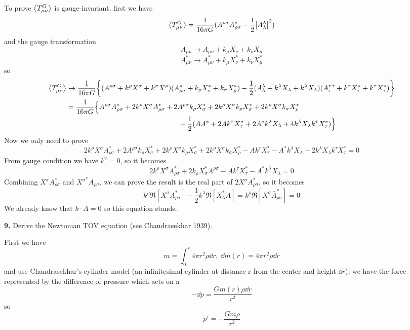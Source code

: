 \documentclass{article}
\newcommand{\la}{\lambda}
\newcommand{\s}{\sigma}
\begin{document}
To prove $\expval{T^G_{\mu\nu}}$ is gauge-invariant, first we have
$$\expval{T^{G}_{\mu\nu}}=\frac{1}{16\pi G}(A^{\rho\s}A^*_{\rho\s}-\frac{1}{2}\abs{A^{\la}_{\la}}^2)$$
and the gauge transformation
$$A_{\mu\nu}\rightarrow A_{\mu\nu}+k_{\mu}X_{\nu}+k_{\nu}X_{\mu}$$
$$A^*_{\mu\nu}\rightarrow A^*_{\mu\nu}+k_{\mu}X^*_{\nu}+k_{\nu}X^*_{\mu}$$
so
\begin{align*}
  \expval{T^{G}_{\mu\nu}}&\rightarrow\frac{1}{16\pi G}\Bqty{(A^{\rho\s}+k^{\rho}X^{\s}+k^{\s}X^{\rho})(A^*_{\rho\s}+k_{\rho}X^*_{\s}+k_{\s}X^*_{\rho})-\frac{1}{2}(A^{\la}_{\la}+k^{\la}X_{\la}+k^{\la}X_{\la})({A^{\tau}_{\tau}}^*+k^{\tau}X^*_{\tau}+k^{\tau}X^*_{\tau})}\\
  &=\frac{1}{16\pi G}\Big\{A^{\rho\s}A^*_{\rho\s}+2k^{\rho}X^{\s}A^*_{\rho\s}+2A^{\rho\s}k_{\rho}X^*_{\s}+2k^{\rho}X^{\s}k_{\rho}X^*_{\s}+2k^{\rho}X^{\s}k_{\s}X^*_{\rho}\\
  &\;\;\;\;\;\;\;\;\;\;\;\;\;\;\;\;\;\;\;\;\;\;\;\;\;\;\;\;\;\;\;\;\;\;\;\;\;\;\;\;\;\;\;\;\;\;\;\;\;\;\;\;\;\;\;\;\;-\frac{1}{2}(AA^*+2Ak^{\tau}X^*_{\tau}+2A^*k^{\la}X_{\la}+4k^{\la}X_{\la}k^{\tau}X^*_{\tau})\Big\}
\end{align*}
Now we only need to prove
$$2k^{\rho}X^{\s}A^*_{\rho\s}+2A^{\rho\s}k_{\rho}X^*_{\s}+2k^{\rho}X^{\s}k_{\rho}X^*_{\s}+2k^{\rho}X^{\s}k_{\s}X^*_{\rho}-Ak^{\tau}X^*_{\tau}-A^*k^{\la}X_{\la}-2k^{\la}X_{\la}k^{\tau}X^*_{\tau}=0$$
From gauge condition we have $k^2=0$, so it becomes
$$2k^{\rho}X^{\s}A^*_{\rho\s}+2k_{\rho}X^*_{\s}A^{\rho\s}-Ak^{\tau}X^*_{\tau}-A^*k^{\la}X_{\la}=0$$
Combining $X^{\s}A^*_{\rho\s}$ and ${X^{\s}}^*A_{\rho\s}$, we can prove the result is the real part of $2X^{\s}A^*_{\rho\s}$, so it becomes
$$k^{\rho}\Re[X^{\s}A^*_{\rho\s}]-\frac{1}{2}k^{\la}\Re[X_{\la}^*A]=k^{\rho}\Re[X^{\s}\bar A^*_{\rho\s}]=0$$
We already know that $k\cdot A=0$ so this equation stands.

{\bf9.}\quad
Derive the Newtonian TOV equation (see Chandrasekhar 1939).

First we have
$$m=\int_0^r4\pi r^2\rho\dd r,\;\dd m(r)=4\pi r^2\rho\dd r$$
and use Chandrasekhar's cylinder model (an infinitesimal cylinder at distance r from the center and height $\dd r$), we have the force represented by the difference of pressure which acts on a
$$-\dd p=\frac{Gm(r)\rho\dd r}{r^2}$$
so
$$p'=-\frac{Gm\rho}{r^2}$$
\end{document}

